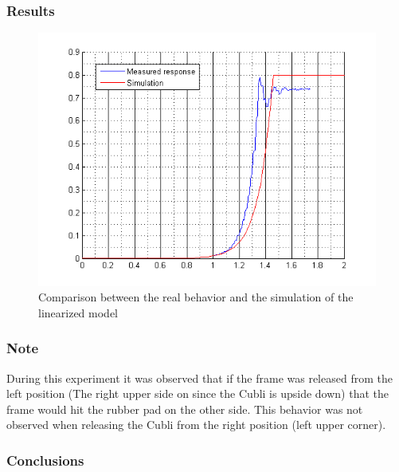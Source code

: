 \subsubsection{Results}
\begin{figure}[H] 
	\centering 
	\includegraphics[scale=0.9]{figures/comparisonRealModel}
	\caption{Comparison between the real behavior and the simulation of the linearized model}
	\label{comparisonRealModel}
\end{figure} 

\subsubsection{Note}
During this experiment it was observed that if the frame was released from the left position (The right upper side on  since the Cubli is upside down) that the frame would hit the rubber pad on the other side. This behavior was not observed when releasing the Cubli from the right position (left upper corner).

\subsubsection{Conclusions}